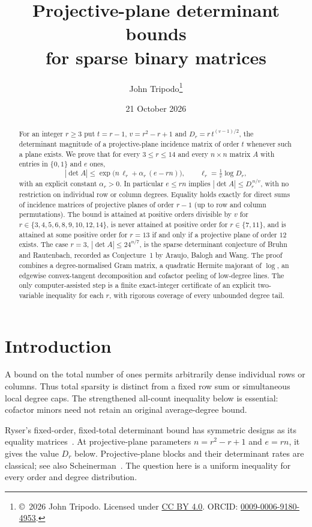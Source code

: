 \documentclass[11pt]{article}
\title{Projective-plane determinant bounds\\for sparse binary matrices}
\author{John Tripodo\thanks{\copyright\ 2026 John Tripodo. Licensed under \href{https://creativecommons.org/licenses/by/4.0/}{CC BY 4.0}. ORCID: \href{https://orcid.org/0009-0006-9180-4953}{0009-0006-9180-4953}.}}
\date{21 October 2026}
\theoremstyle{remark}
\begin{document}
\maketitle

\begin{abstract}
For an integer $r\ge 3$ put $t=r-1$, $v=r^2-r+1$ and $D_r=r\,t^{(v-1)/2}$, the determinant magnitude of a projective-plane incidence matrix of order $t$ whenever such a plane exists. We prove that for every $3\le r\le 14$ and every
$n\times n$ matrix $A$ with entries in $\{0,1\}$ and $e$ ones,
\[
|\det A|\le \exp\!\bigl(n\,\ell_r+\alpha_r\,(e-rn)\bigr),\qquad \ell_r=\tfrac1v\log D_r,
\]
with an explicit constant $\alpha_r>0$. In particular $e\le rn$ implies $|\det A|\le D_r^{\,n/v}$, with no
restriction on individual row or column degrees. Equality holds exactly for direct sums of incidence matrices of
projective planes of order $r-1$ (up to row and column permutations). The bound is attained at positive orders divisible by $v$ for
$r\in\{3,4,5,6,8,9,10,12,14\}$, is never attained at positive order for
$r\in\{7,11\}$, and is attained at some positive order for $r=13$ if and only
if a projective plane of order $12$ exists. The case $r=3$, $|\det A|\le 24^{n/7}$, is the sparse
determinant conjecture of Bruhn and Rautenbach, recorded as Conjecture~1 by Araujo, Balogh and Wang.
The proof combines a degree-normalised Gram matrix, a quadratic Hermite majorant of $\log$, an edgewise
convex-tangent decomposition and cofactor peeling of low-degree lines. The only computer-assisted step is a
finite exact-integer certificate of an explicit two-variable inequality for each $r$, with rigorous coverage of every unbounded degree tail.
\end{abstract}

\section{Introduction}
A bound on the total number of ones permits arbitrarily dense individual rows
or columns. Thus total sparsity is distinct from a fixed row sum or simultaneous
local degree caps. The strengthened all-count inequality below is essential:
cofactor minors need not retain an original average-degree bound.

Ryser's fixed-order, fixed-total determinant bound has symmetric designs as
its equality matrices~\cite[Theorem~3]{Ry}. At projective-plane parameters
$n=r^2-r+1$ and $e=rn$, it gives the value $D_r$ below. Projective-plane blocks
and their determinant rates are classical; see also Scheinerman~\cite[Section~2]{S}.
The question here is a uniform inequality for every order and degree distribution.
\end{document}

